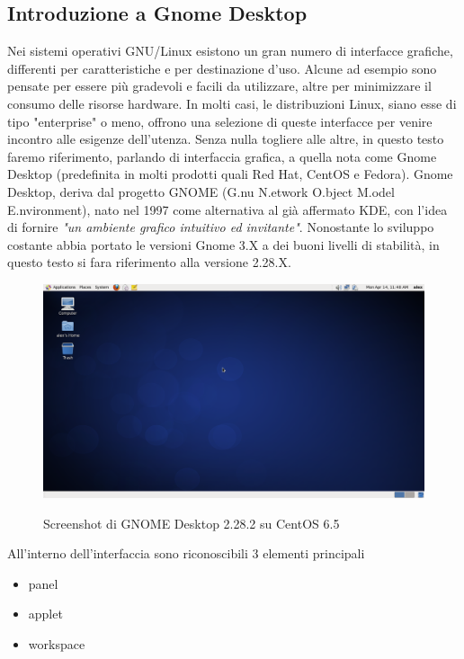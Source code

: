 \subsection{Introduzione a Gnome Desktop}

Nei sistemi operativi GNU/Linux esistono un gran numero di interfacce grafiche, differenti per caratteristiche e per destinazione d'uso. Alcune ad esempio sono pensate per essere più gradevoli e facili da utilizzare, altre per minimizzare il consumo delle risorse hardware. In molti casi, le distribuzioni Linux, siano esse di tipo "enterprise" o meno, offrono una selezione di queste interfacce per venire incontro alle esigenze dell'utenza. Senza nulla togliere alle altre, in questo testo faremo riferimento, parlando di interfaccia grafica, a quella nota come Gnome Desktop (predefinita in molti prodotti quali Red Hat, CentOS e Fedora). Gnome Desktop, deriva dal progetto GNOME (G.nu N.etwork O.bject M.odel E.nvironment), nato nel 1997 come alternativa al già affermato KDE, con l'idea di fornire \textit{"un ambiente grafico intuitivo ed invitante"}. Nonostante lo sviluppo costante abbia portato le versioni Gnome 3.X a dei buoni livelli di stabilità, in questo testo si fara riferimento alla versione 2.28.X.

\begin{figure}[!ht]
 \includegraphics[scale=.24]{Immagini/UI_01.png}
 \label{fig:Gnome Desktop 2.28.2}
 \caption{Screenshot di GNOME Desktop 2.28.2 su CentOS 6.5}
\end{figure}

All'interno dell'interfaccia sono riconoscibili 3 elementi principali

\begin{itemize}
 \item panel
 \item applet
 \item workspace
\end{itemize}

